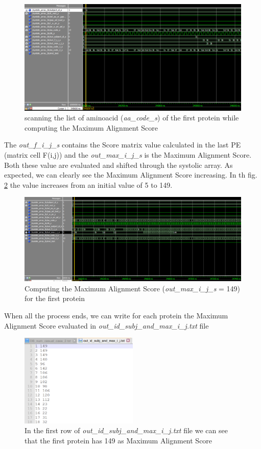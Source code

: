 \begin{figure}[h!]
	\centering
	\includegraphics[width=\textwidth]{imm/sw/evaluating_output_1.png}
	\caption{scanning the list of aminoacid (\textit{aa\_code\_s}) of the first protein while computing the Maximum Alignment Score } 
	\label{output_evaluation_1}
\end{figure}

The\textit{ out\_f\_i\_j\_s} contains the Score matrix value calculated in the last PE (matrix cell F(i,j)) and the \textit{out\_max\_i\_j\_s} is the Maximum Alignment Score. Both these value are evaluated and shifted through the systolic array. As expected,  we can clearly see the Maximum Alignment Score increasing. In th fig. \ref{149} the value increases from an initial value of 5 to 149.
\begin{figure}[h!]
	\centering
	\includegraphics[width=\textwidth]{imm/sw/149.png}
	\caption{Computing the  Maximum Alignment Score (\textit{out\_max\_i\_j\_s} = 149) for the first protein } 
	\label{149}
\end{figure}
When all the process ends, we can write for each protein the Maximum Alignment Score evaluated in \textit{out\_id\_subj\_and\_max\_i\_j.txt} file

\begin{figure}[h!]
	\centering
	\includegraphics[width=0.5\textwidth]{imm/sw/out_149.png}
	\caption{In the first row of \textit{out\_id\_subj\_and\_max\_i\_j.txt} file we can see that the first protein has 149 as Maximum Alignment Score} 
	\label{out149}
\end{figure}
